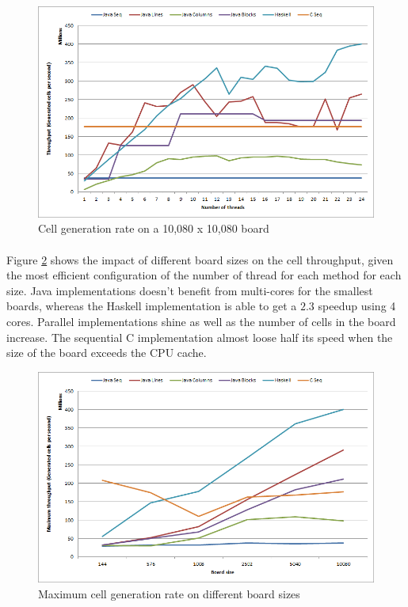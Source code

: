 \documentclass[a4paper]{article}
\begin{document}
    \begin{figure}[h]
        \centering
        \includegraphics[width=0.7\linewidth]{results/10080_throughput.png}
        \caption{
            Cell generation rate on a 10,080 x 10,080 board
            \label{fig:10080_throughput}
        }
    \end{figure}

    \paragraph{}Figure \ref{fig:board_size_impact} shows the impact of different
board sizes on the cell throughput, given the most efficient configuration of
the  number of thread for each method for each size. \newline
Java implementations doesn't benefit from multi-cores for the smallest boards,
whereas the Haskell implementation is able to get a $2.3$ speedup using 4 cores.
Parallel implementations shine as well as the number of cells in the board
increase. The sequential C implementation almost loose half its speed when the 
size of the board exceeds the CPU cache.


    \begin{figure}[h]
        \centering
        \includegraphics[width=0.7\linewidth]{results/board_size_impact.png}
        \caption{
            Maximum cell generation rate on different board sizes
            \label{fig:board_size_impact}
        }
    \end{figure}
  
\end{document}

